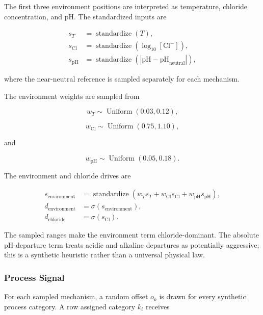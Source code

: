 \documentclass{article}
\begin{document}
The first three environment positions are interpreted as temperature, chloride concentration, and pH. The standardized inputs are

\begin{equation}
\begin{aligned}
s_T
&=
\operatorname{standardize}(T),\\
s_{\mathrm{Cl}}
&=
\operatorname{standardize}
\left(
\log_{10}[\mathrm{Cl}^{-}]
\right),\\
s_{\mathrm{pH}}
&=
\operatorname{standardize}
\left(
\left|
\mathrm{pH}
-
\mathrm{pH}_{\mathrm{neutral}}
\right|
\right),
\end{aligned}
\label{eq:fixed-environment-inputs}
\end{equation}

where the near-neutral reference is sampled separately for each mechanism.

The environment weights are sampled from

\[
w_T
\sim
\operatorname{Uniform}(0.03,0.12),
\]

\[
w_{\mathrm{Cl}}
\sim
\operatorname{Uniform}(0.75,1.10),
\]

and

\[
w_{\mathrm{pH}}
\sim
\operatorname{Uniform}(0.05,0.18).
\]

The environment and chloride drives are

\begin{equation}
\begin{aligned}
s_{\mathrm{environment}}
&=
\operatorname{standardize}
\left(
w_Ts_T
+
w_{\mathrm{Cl}}s_{\mathrm{Cl}}
+
w_{\mathrm{pH}}s_{\mathrm{pH}}
\right),\\
d_{\mathrm{environment}}
&=
\sigma(s_{\mathrm{environment}}),\\
d_{\mathrm{chloride}}
&=
\sigma(s_{\mathrm{Cl}}).
\end{aligned}
\label{eq:fixed-environment-drive}
\end{equation}

The sampled ranges make the environment term chloride-dominant. The absolute pH-departure term treats acidic and alkaline departures as potentially aggressive; this is a synthetic heuristic rather than a universal physical law.

\subsubsection{Process Signal}

For each sampled mechanism, a random offset \(o_k\) is drawn for every synthetic process category. A row assigned category \(k_i\) receives
\end{document}
